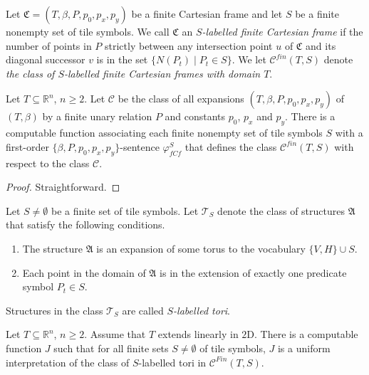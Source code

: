 \documentclass{LMCS}
\theoremstyle{plain}
\newcommand{\rsq}{\mathbb{R}^n}
\newcommand{\mf}{\mathfrak}
\newcommand{\mi}{\mathit}
\begin{document}
%
%
%
%
%
%
\begin{defi}
%
Let $\mf{C}=(T,\beta,P,p_0,p_x,p_y)$ be a finite Cartesian frame and let $S$ be a finite nonempty set of tile symbols.
We call $\mf{C}$ an \emph{$S$-labelled finite Cartesian frame} if the number of points in $P$ strictly between
any intersection point $u$ of $\mf{C}$ and its diagonal successor $v$ is in the set $\{N(P_t)\mid P_t\in S\}$.
%
%
We let
$\mathcal{C}^{fin}(T,S)$ denote \emph{the class of $S$-labelled finite Cartesian frames with domain $T$}.
\end{defi}
%

\begin{lem}\label{finitedefinable}
%
Let $T\subseteq \rsq$, $n\geq 2$.  Let $\mathcal{C}$ be the class of all expansions $(T,\beta,P,p_0,p_x,p_y)$ of $(T,\beta)$ by a finite
%
unary relation $P$ and constants $p_0$, $p_x$ and $p_y$. There is a computable function associating each finite nonempty set of tile symbols $S$ with a first-order $\{\beta,P,p_0,p_x,p_y\}$-sentence $\varphi_{fCf}^S$ 
%
that defines the class $\mathcal{C}^\mi{fin}(T,S)$ with respect to the class $\mathcal{C}$.
%
\end{lem}
\begin{proof}
Straightforward.
\end{proof}
%
%
%
%
Let $S\not=\emptyset$ be a finite set of tile symbols.
Let $\mathcal{T}_S$ denote the class of structures $\mf{A}$ that satisfy the following conditions.
\begin{enumerate}
\item The structure $\mf{A}$ is an expansion of some torus to the vocabulary $\{V,H\}\cup S$.
\item Each point in the domain of $\mf{A}$ is in the extension of exactly one predicate symbol $P_t\in S$.
\end{enumerate} 
Structures in the class $\mathcal{T}_S$ are called \emph{$S$-labelled tori}.
%
%
%
\begin{lem}\label{torusinterpretablelemma}
%
Let $T\subseteq\mathbb{R}^n$, $n\geq 2$. Assume that $T$ extends linearly in $\mathrm{2D}$.
%
There is a computable function $J$ such that for all finite sets $S\not=\emptyset$ of tile symbols, $J$ is a
%
uniform interpretation of the class of $S$-labelled tori in
%
 $\mathcal{C}^\mi{Fin}(T,S)$.
%
\end{lem}
%
%
%
\end{document}
